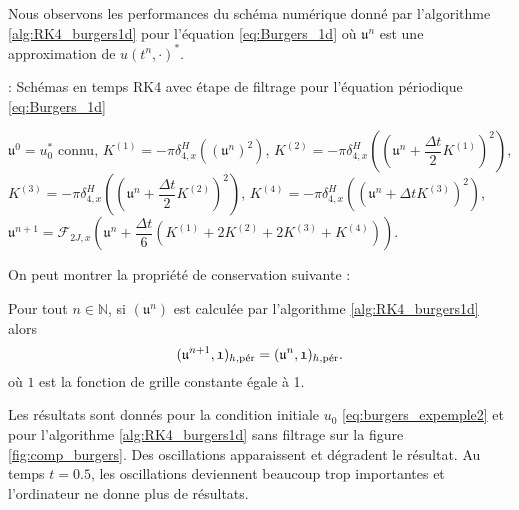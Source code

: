 Nous observons les performances du schéma numérique donné par l'algorithme \ref{alg:RK4_burgers1d} pour l'équation \eqref{eq:Burgers_1d} où $\mathfrak{u}^n$ est une approximation de $u(t^n, \cdot)^*$.

\begin{center}
\begin{minipage}[H]{12cm}
  \begin{algorithm}[H]
    \caption{: Schémas en temps RK4 avec étape de filtrage pour l'équation périodique \eqref{eq:Burgers_1d}}\label{alg:RK4_burgers1d}
    \begin{algorithmic}[1]
    \State $\mathfrak{u}^0 = u_0^*$ connu,
             \State  $K^{(1)} = - \pi \delta_{4,x}^H \left(\left( \mathfrak{u}^n \right)^2\right)$,
             \State  $K^{(2)} = - \pi \delta_{4,x}^H \left(\left( \mathfrak{u}^n + \dfrac{\Delta t}{2} K^{(1)}\right)^2\right)$,
             \State  $K^{(3)} = - \pi \delta_{4,x}^H \left(\left( \mathfrak{u}^n + \dfrac{\Delta t}{2} K^{(2)}\right)^2\right)$,
             \State  $K^{(4)} = - \pi \delta_{4,x}^H \left(\left( \mathfrak{u}^n + \Delta t K^{(3)}\right)^2\right)$,  
             \State  $\mathfrak{u}^{n+1} = \mathcal{F}_{2J,x}\left( \mathfrak{u}^n  + \dfrac{\Delta t}{6} \left( K^{(1)} + 2 K^{(2)} + 2 K^{(3)} + K^{(4)} \right) \right)$.
            \EndFor
    \end{algorithmic}
    \end{algorithm}
\end{minipage}
\end{center}

On peut montrer la propriété de conservation suivante :
\begin{proposition}
Pour tout $n \in \mathbb{N}$, si $(\mathfrak{u}^n)$ est calculée par l'algorithme \ref{alg:RK4_burgers1d} alors
\begin{equation}
(\mathfrak{u}^{n+1}, \mathfrak{1})_{h,\per} = (\mathfrak{u}^n, \mathfrak{1})_{h,\per}.
\end{equation}
où $\mathfrak{1}$ est la fonction de grille constante égale à 1.
\end{proposition}

Les résultats sont donnés pour la condition initiale $u_0$ \eqref{eq:burgers_expemple2} et pour l'algorithme \ref{alg:RK4_burgers1d} sans filtrage sur la figure \ref{fig:comp_burgers}. Des oscillations apparaissent et dégradent le résultat. Au temps $t=0.5$, les oscillations deviennent beaucoup trop importantes et l'ordinateur ne donne plus de résultats.

